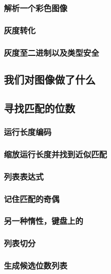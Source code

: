 \documentclass[./main.tex]{subfiles}
\begin{document}
\subsubsection*{解析一个彩色图像}

\subsubsection*{灰度转化}

\subsubsection*{灰度至二进制以及类型安全}

\subsection*{我们对图像做了什么}

\subsection*{寻找匹配的位数}

\subsubsection*{运行长度编码}

\subsubsection*{缩放运行长度并找到近似匹配}

\subsubsection*{列表表达式}

\subsubsection*{记住匹配的奇偶}

\subsubsection*{另一种惰性，键盘上的}

\subsubsection*{列表切分}

\subsubsection*{生成候选位数列表}
\end{document}
